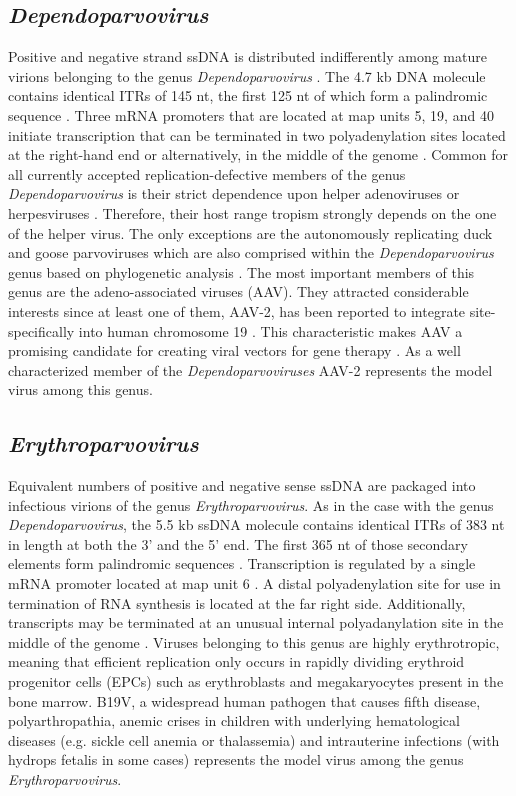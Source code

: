 \subsection{\textit{Dependoparvovirus}}
Positive and negative strand ssDNA is distributed indifferently among mature virions belonging to the genus \textit{Dependoparvovirus} \cite{pmid5014934, pmid5264145}. The 4.7 kb DNA molecule contains identical ITRs of 145 nt, the first 125 nt of which form a palindromic sequence \cite{pmid6246271}. Three mRNA promoters that are located at map units 5, 19, and 40 initiate transcription that can be terminated in two polyadenylation sites located at the right-hand end or alternatively, in the middle of the genome \cite{pmid6253077, pmid6281463}. Common for all currently accepted replication-defective members of the genus \textit{Dependoparvovirus} is their strict dependence upon helper adenoviruses or herpesviruses \cite{pmid4318977, pmid6270377, pmid5227666}. Therefore, their host range tropism strongly depends on the one of the helper virus. 
The only exceptions are the autonomously replicating duck and goose parvoviruses which are also comprised within the \textit{Dependoparvovirus} genus based on phylogenetic analysis \cite{icvt}. The most important members of this genus are the adeno-associated viruses (AAV). They attracted considerable interests since at least one of them, AAV-2, has been reported to integrate site-specifically into human chromosome 19 \cite{pmid2156265, pmid1653762, pmid1334463, pmid1657596}. This characteristic makes AAV a promising candidate for creating viral vectors for gene therapy \cite{pmid18854481, pmid21499295}. As a well characterized member of the \textit{Dependoparvoviruses} AAV-2 represents the model virus among this genus.  


\subsection{\textit{Erythroparvovirus}}
Equivalent numbers of positive and negative sense ssDNA are packaged into infectious virions of the genus \textit{Erythroparvovirus}. As in the case with the genus \textit{Dependoparvovirus}, the 5.5 kb ssDNA molecule contains identical ITRs of 383 nt in length at both the 3’ and the 5’ end. The first 365 nt of those secondary elements form palindromic sequences \cite{pmid2408228}. Transcription is regulated by a single mRNA promoter located at map unit 6 \cite{pmid3824910}. A distal polyadenylation site for use in termination of RNA synthesis is located at the far right side. Additionally, transcripts may be terminated at an unusual internal polyadanylation site in the middle of the genome \cite{pmid3599180}. Viruses belonging to this genus are highly erythrotropic, meaning that efficient replication only occurs in rapidly dividing erythroid progenitor cells (EPCs) such as erythroblasts and megakaryocytes present in the bone marrow.
B19V, a widespread human pathogen that causes fifth disease, polyarthropathia, anemic crises in children with underlying hematological diseases (e.g. sickle cell anemia or thalassemia) and intrauterine infections (with hydrops fetalis in some cases) \cite{pmid12097253} represents the model virus among the genus \textit{Erythroparvovirus}. 

